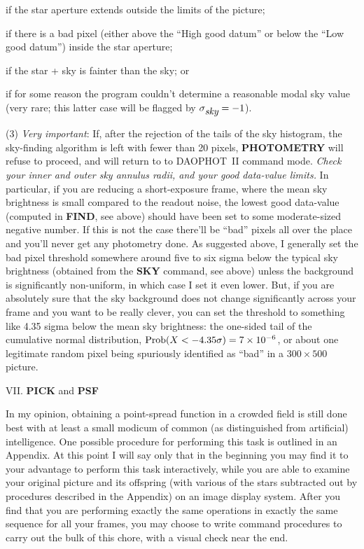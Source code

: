  if the star aperture extends outside the limits of the picture;

 if there is a bad pixel (either above the ``High good
datum'' or below the ``Low good datum'') inside the star aperture;

 if the star + sky is fainter than the sky; or

 if for some reason the program couldn't determine a
reasonable modal sky value (very rare; this latter case will be flagged
by $\sigma_{\hbox{\it sky}} = -1$).

\item{(3)} {\it Very important\/}:  If, after the rejection of the
tails of the sky histogram, the sky-finding algorithm is left with
fewer than 20 pixels, {\bf PHOTOMETRY} will refuse to proceed, and will
return to to DAOPHOT~II command mode.  {\it Check your inner and outer
sky annulus radii, and your good data-value limits.\/}  In particular,
if you are reducing a short-exposure frame, where the mean sky
brightness is small compared to the readout noise, the lowest good
data-value (computed in {\bf FIND}, see above) should have been set to
some moderate-sized negative number.  If this is not the case there'll
be ``bad'' pixels all over the place and you'll never get any
photometry done.  As suggested above, I generally set the bad pixel
threshold somewhere around five to six sigma below the typical sky
brightness (obtained from the {\bf SKY} command, see above) unless the
background is significantly non-uniform, in which case I set it even
lower.  But, if you are absolutely sure that the sky background does
not change significantly across your frame and you want to be really
clever, you can set the threshold to something like 4.35 sigma below
the mean sky brightness:  the one-sided tail of the cumulative normal
distribution, $\hbox{\rm Prob}(X < -4.35 \sigma) = 7\times 10^{-6}$, or
about one legitimate random pixel being spuriously identified as
``bad'' in a $300 \times 500$ picture.

\vfill
\eject
\noindent VII.  {\bf PICK} and {\bf PSF}

In my opinion, obtaining a point-spread function in a crowded field is
still done best with at least a small modicum of common (as
distinguished from artificial) intelligence. One possible procedure for
performing this task is outlined in an Appendix. At this point I will
say only that in the beginning you may find it to your advantage to
perform this task interactively, while you are able to examine your
original picture and its offspring (with various of the stars
subtracted out by procedures described in the Appendix) on an image
display system.  After you find that you are performing exactly the
same operations in exactly the same sequence for all your frames, you
may choose to write command procedures to carry out the bulk of this
chore, with a visual check near the end.

